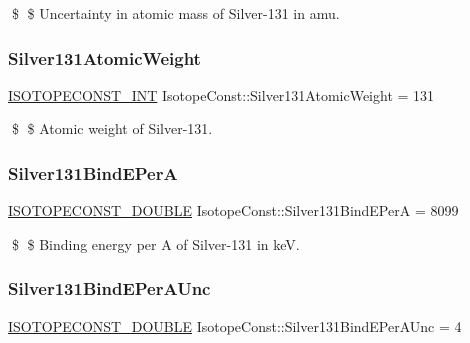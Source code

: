 \$ \$ Uncertainty in atomic mass of Silver-\/131 in amu. \mbox{\label{group___isotope_const-_silver-_ag131_ga85ac73e07407b908e1db96719c02bf04}} 
\subsubsection{\texorpdfstring{Silver131\+Atomic\+Weight}{Silver131AtomicWeight}}
{\footnotesize\ttfamily \mbox{\hyperlink{group___isotope_const-_macros_ga5f18360b3e99483a35c32d789e62621c}{I\+S\+O\+T\+O\+P\+E\+C\+O\+N\+S\+T\+\_\+\+I\+NT}} Isotope\+Const\+::\+Silver131\+Atomic\+Weight = 131}

\$ \$ Atomic weight of Silver-\/131. \mbox{\label{group___isotope_const-_silver-_ag131_ga58c9fa048100cad4e81b730f42803a81}} 
\subsubsection{\texorpdfstring{Silver131\+Bind\+E\+PerA}{Silver131BindEPerA}}
{\footnotesize\ttfamily \mbox{\hyperlink{group___isotope_const-_macros_ga8f45a7272ce02c0b4c65c44636ed719a}{I\+S\+O\+T\+O\+P\+E\+C\+O\+N\+S\+T\+\_\+\+D\+O\+U\+B\+LE}} Isotope\+Const\+::\+Silver131\+Bind\+E\+PerA = 8099}

\$ \$ Binding energy per A of Silver-\/131 in keV. \mbox{\label{group___isotope_const-_silver-_ag131_ga4cf7627029d3692ba331b4a3a1ff1d8e}} 
\subsubsection{\texorpdfstring{Silver131\+Bind\+E\+Per\+A\+Unc}{Silver131BindEPerAUnc}}
{\footnotesize\ttfamily \mbox{\hyperlink{group___isotope_const-_macros_ga8f45a7272ce02c0b4c65c44636ed719a}{I\+S\+O\+T\+O\+P\+E\+C\+O\+N\+S\+T\+\_\+\+D\+O\+U\+B\+LE}} Isotope\+Const\+::\+Silver131\+Bind\+E\+Per\+A\+Unc = 4}

